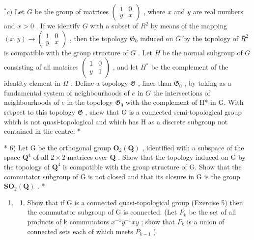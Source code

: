 \(^{*}c)\) Let \(G\) be the group of matrices \(\begin{pmatrix} 1 & 0 \\ y & x \end{pmatrix}\) , where \(x\) and \(y\) are real numbers and \(x > 0\) . If we identify \(G\) with a subset of \(R^2\) by means of the mapping \((x, y) \to \begin{pmatrix} 1 & 0 \\ y & x \end{pmatrix}\) , then the topology \(\mathfrak{G}_0\) induced on \(G\) by the topology of \(R^2\) is compatible with the group structure of \(G\) . Let \(H\) be the normal subgroup of \(G\) consisting of all matrices \(\begin{pmatrix} 1 & 0 \\ y & 1 \end{pmatrix}\) , and let \(H^*\) be the complement of the identity element in \(H\) . Define a topology \(\mathfrak{G}\) , finer than \(\mathfrak{G}_0\) , by taking as a fundamental system of neighbourhoods of \(e\) in \(G\) the intersections of neighbourhoods of \(e\) in the topology \(\mathfrak{G}_{0}\) with the complement of H* in G. With respect to this topology \(\mathfrak{G}\) , show that G is a connected semi-topological group which is not quasi-topological and which has H as a discrete subgroup not contained in the centre. *

* 6) Let G be the orthogonal group \(\mathbf{O}_{2}(\mathbf{Q})\) , identified with a subspace of the space \(\mathbf{Q}^{4}\) of all \(2 \times 2\) matrices over \(\mathbf{Q}\) . Show that the topology induced on G by the topology of \(\mathbf{Q}^{4}\) is compatible with the group structure of G. Show that the commutator subgroup of G is not closed and that its closure in G is the group \(\mathbf{SO}_{2}(\mathbf{Q})\) . *

\begin{enumerate}
\def\labelenumi{\arabic{enumi})}
\setcounter{enumi}{6}
\tightlist
\item
  \begin{enumerate}
  \def\labelenumii{\alph{enumii})}
  \tightlist
  \item
    Show that if G is a connected quasi-topological group (Exercise 5) then the commutator subgroup of G is connected. (Let \(P_k\) be the set of all products of k commutators \(x^{-1}y^{-1}xy\) ; show that \(P_k\) is a union of connected sets each of which meets \(P_{k-1}\) ).
  \end{enumerate}
\end{enumerate}

